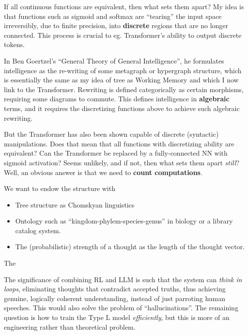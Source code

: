 \documentclass[runningheads]{llncs}
\begin{document}
If all continuous functions are equivalent, then what sets them apart?  My idea is that functions such as sigmoid and softmax are ``tearing'' the input space irreversibly, due to finite precision, into \textbf{discrete} regions that are no longer connected.  This process is crucial to eg. Transformer's ability to output discrete tokens.

In Ben Goertzel's ``General Theory of General Intelligence'', he formulates intelligence as the re-writing of some metagraph or hypergraph structure, which is essentially the same as my idea of tree as Working Memory and which I now link to the Transformer.  Rewriting is defined categorically as certain morphisms, requiring some diagrams to commute.  This defines intelligence in \textbf{algebraic} terms, and it requires the discretizing functions above to achieve such algebraic rewriting.

But the Transformer has also been shown capable of discrete (syntactic) manipulations.  Does that mean that all functions with discretizing ability are equivalent?  Can the Transformer be replaced by a fully-connected NN with sigmoid activation?  Seems unlikely, and if not, then what sets them apart \textit{still}?  Well, an obvious answer is that we need to \textbf{count computations}.



We want to endow the structure with
\begin{itemize}
	\item Tree structure as Chomskyan linguistics

	\item Ontology such as ``kingdom-phylem-species-genus'' in biology or a library catalog system.

	\item The (probabilistic) strength of a thought as the length of the thought vector.
\end{itemize}

The

The significance of combining RL and LLM is such that the system can \textit{think in loops}, eliminating thoughts that contradict accepted truths, thus achieving genuine, logically coherent understanding, instead of just parroting human speeches.  This would also solve the problem of ``hallucinations''.  The remaining question is how to train the Type L model \textit{efficiently}, but this is more of an engineering rather than theoretical problem.
\end{document}
